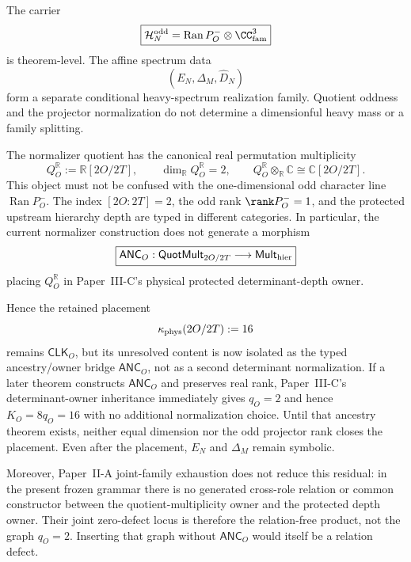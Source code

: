 \documentclass[12pt,a4paper]{article}
\newcommand{\Ran}{\operatorname{Ran}}
\begin{document}
\begin{corollary}
\label{p6:cor:heavy-carrier-spectrum-firewall}
The carrier
\[
\boxed{
\mathcal H_N^{\rm odd}=\Ran P_O^-\otimes\CC^3_{\rm fam}
}
\]
is theorem-level.  The affine spectrum data
\[
\boxed{(E_N,\Delta_M,\widehat D_N)}
\]
form a separate conditional heavy-spectrum realization family.  Quotient
oddness and the projector normalization do not determine a dimensionful
heavy mass or a family splitting.
\end{corollary}

\begin{proposition}
\label{p6:prop:heavy-clock-separation}
The normalizer quotient has the canonical real permutation multiplicity
\[
 Q_O^{\mathbb R}:=\mathbb R[2O/2T],
 \qquad
 \dim_{\mathbb R}Q_O^{\mathbb R}=2,
 \qquad
 Q_O^{\mathbb R}\otimes_{\mathbb R}\mathbb C\cong\mathbb C[2O/2T].
\]
This object must not be confused with the one-dimensional odd character line
\(\Ran P_O^-\).  The index \([2O:2T]=2\), the odd rank
\(\rank P_O^-=1\), and the protected upstream hierarchy depth are typed in
different categories.  In particular, the current normalizer construction
does not generate a morphism
\[
 \boxed{
 \mathsf{ANC}_O:
 \mathsf{QuotMult}_{2O/2T}\longrightarrow\mathsf{Mult}_{\rm hier}}
\]
placing \(Q_O^{\mathbb R}\) in Paper~III-C's physical protected
determinant-depth owner.

Hence the retained placement
\[
 \kappa_{\rm phys}(2O/2T):=16
\]
remains \(\mathsf{CLK}_O\), but its unresolved content is now isolated as the
typed ancestry/owner bridge \(\mathsf{ANC}_O\), not as a second determinant
normalization.  If a later theorem constructs \(\mathsf{ANC}_O\) and preserves
real rank, Paper~III-C's determinant-owner inheritance immediately gives
\(q_O=2\) and hence \(K_O=8q_O=16\) with no additional normalization choice.
Until that ancestry theorem exists, neither equal dimension nor the odd
projector rank closes the placement.  Even after the placement, \(E_N\) and
\(\Delta_M\) remain symbolic.

Moreover, Paper~II-A joint-family exhaustion does not reduce this residual:
in the present frozen grammar there is no generated cross-role relation or
common constructor between the quotient-multiplicity owner and the protected
depth owner.  Their joint zero-defect locus is therefore the relation-free
product, not the graph \(q_O=2\).  Inserting that graph without
\(\mathsf{ANC}_O\) would itself be a relation defect.
\end{proposition}
\end{document}
